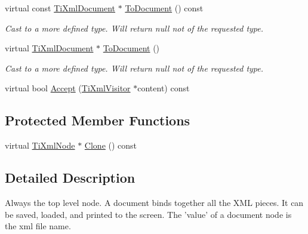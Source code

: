 \begin{DoxyCompactItemize}
\item 
\hypertarget{class_ti_xml_document_a1dc977bde3e4fe85a8eb9d88a35ef5a4}{
virtual const \hyperlink{class_ti_xml_document}{TiXmlDocument} $\ast$ \hyperlink{class_ti_xml_document_a1dc977bde3e4fe85a8eb9d88a35ef5a4}{ToDocument} () const }
\label{class_ti_xml_document_a1dc977bde3e4fe85a8eb9d88a35ef5a4}

\begin{DoxyCompactList}\small\item\em Cast to a more defined type. Will return null not of the requested type. \end{DoxyCompactList}\item 
\hypertarget{class_ti_xml_document_a1025d942a1f328fd742d545e37efdd42}{
virtual \hyperlink{class_ti_xml_document}{TiXmlDocument} $\ast$ \hyperlink{class_ti_xml_document_a1025d942a1f328fd742d545e37efdd42}{ToDocument} ()}
\label{class_ti_xml_document_a1025d942a1f328fd742d545e37efdd42}

\begin{DoxyCompactList}\small\item\em Cast to a more defined type. Will return null not of the requested type. \end{DoxyCompactList}\item 
virtual bool \hyperlink{class_ti_xml_document_a3daab2f472418ef66315750202f762ae}{Accept} (\hyperlink{class_ti_xml_visitor}{TiXmlVisitor} $\ast$content) const 
\end{DoxyCompactItemize}
\subsection*{Protected Member Functions}
\begin{DoxyCompactItemize}
\item 
virtual \hyperlink{class_ti_xml_node}{TiXmlNode} $\ast$ \hyperlink{class_ti_xml_document_ac9e8f09b23454d953b32d1b65cd1409e}{Clone} () const 
\end{DoxyCompactItemize}


\subsection{Detailed Description}
Always the top level node. A document binds together all the XML pieces. It can be saved, loaded, and printed to the screen. The 'value' of a document node is the xml file name. 

